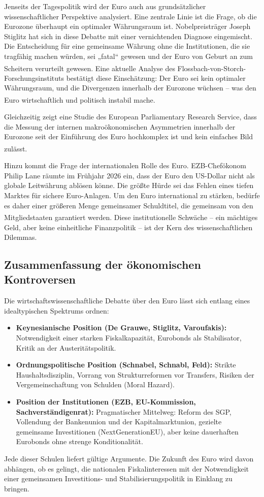 \documentclass[12pt,a4paper]{article}
\newcommand{\footcite}[1]{\textsuperscript{\cite{#1}}}
\begin{document}
	Jenseits der Tagespolitik wird der Euro auch aus grundsätzlicher wissenschaftlicher Perspektive analysiert. Eine zentrale Linie ist die Frage, ob die Eurozone überhaupt ein optimaler Währungsraum ist. Nobelpreisträger Joseph Stiglitz hat sich in diese Debatte mit einer vernichtenden Diagnose eingemischt. Die Entscheidung für eine gemeinsame Währung ohne die Institutionen, die sie tragfähig machen würden, sei „fatal“ gewesen und der Euro von Geburt an zum Scheitern verurteilt gewesen.\footcite{Stiglitz} Eine aktuelle Analyse des Flossbach-von-Storch-Forschungsinstituts bestätigt diese Einschätzung: Der Euro sei kein optimaler Währungsraum, und die Divergenzen innerhalb der Eurozone wüchsen – was den Euro wirtschaftlich und politisch instabil mache.\footcite{Schnabl2025a}
	
	Gleichzeitig zeigt eine Studie des European Parliamentary Research Service, dass die Messung der internen makroökonomischen Asymmetrien innerhalb der Eurozone seit der Einführung des Euro hochkomplex ist und kein einfaches Bild zulässt.\footcite{EPRS2025a}
	
	Hinzu kommt die Frage der internationalen Rolle des Euro. EZB-Chefökonom Philip Lane räumte im Frühjahr 2026 ein, dass der Euro den US-Dollar nicht als globale Leitwährung ablösen könne. Die größte Hürde sei das Fehlen eines tiefen Marktes für sichere Euro-Anlagen. Um den Euro international zu stärken, bedürfe es daher einer größeren Menge gemeinsamer Schuldtitel, die gemeinsam von den Mitgliedstaaten garantiert werden.\footcite{Lane2026a} Diese institutionelle Schwäche – ein mächtiges Geld, aber keine einheitliche Finanzpolitik – ist der Kern des wissenschaftlichen Dilemmas.
	
	\subsection{Zusammenfassung der ökonomischen Kontroversen}
	
	Die wirtschaftswissenschaftliche Debatte über den Euro lässt sich entlang eines idealtypischen Spektrums ordnen:
	\begin{itemize}
		\item \textbf{Keynesianische Position (De Grauwe, Stiglitz, Varoufakis):} Notwendigkeit einer starken Fiskalkapazität, Eurobonds als Stabilisator, Kritik an der Austeritätspolitik.
		\item \textbf{Ordnungspolitische Position (Schnabel, Schnabl, Feld):} Strikte Haushaltsdisziplin, Vorrang von Strukturreformen vor Transfers, Risiken der Vergemeinschaftung von Schulden (Moral Hazard).
		\item \textbf{Position der Institutionen (EZB, EU-Kommission, Sachverständigenrat):} Pragmatischer Mittelweg: Reform des SGP, Vollendung der Bankenunion und der Kapitalmarktunion, gezielte gemeinsame Investitionen (NextGenerationEU), aber keine dauerhaften Eurobonds ohne strenge Konditionalität.
	\end{itemize}
	Jede dieser Schulen liefert gültige Argumente. Die Zukunft des Euro wird davon abhängen, ob es gelingt, die nationalen Fiskalinteressen mit der Notwendigkeit einer gemeinsamen Investitions- und Stabilisierungspolitik in Einklang zu bringen.
	
\end{document}
